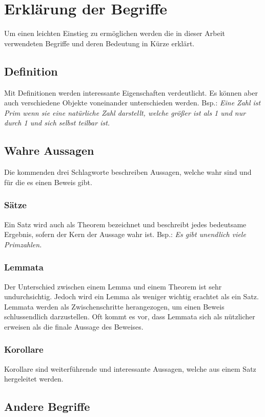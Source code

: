 \documentclass[12pt,a4paper]{article}
\theoremstyle{definition}
\begin{document}
\section*{Erklärung der Begriffe}
Um einen leichten Einstieg zu ermöglichen werden die in dieser Arbeit verwendeten Begriffe und deren Bedeutung in Kürze erklärt.

\subsection*{Definition}
Mit Definitionen werden interessante Eigenschaften verdeutlicht.
Es können aber auch verschiedene Objekte voneinander unterschieden werden.\newline
Bsp.: \textit{Eine Zahl ist Prim wenn sie eine natürliche Zahl darstellt, welche größer ist als 1 und nur durch 1 und sich selbst teilbar ist.}
\subsection*{Wahre Aussagen}
Die kommenden drei Schlagworte beschreiben Aussagen, welche wahr sind und für die es einen Beweis gibt.
\subsubsection*{Sätze}
Ein Satz wird auch als Theorem bezeichnet und beschreibt jedes bedeutsame Ergebnis, sofern der Kern der Aussage wahr ist.\newline
Bsp.: \textit{Es gibt unendlich viele Primzahlen.}
\subsubsection*{Lemmata}
Der Unterschied zwischen einem Lemma und einem Theorem ist sehr undurchsichtig.
Jedoch wird ein Lemma als weniger wichtig erachtet als ein Satz.
Lemmata werden als Zwischenschritte herangezogen, um einen Beweis schlussendlich darzustellen.
Oft kommt es vor, dass Lemmata sich als nützlicher erweisen als die finale Aussage des Beweises.
\subsubsection*{Korollare}
Korollare sind weiterführende und interessante Aussagen, welche aus einem Satz hergeleitet werden.

\subsection*{Andere Begriffe}
\end{document}
